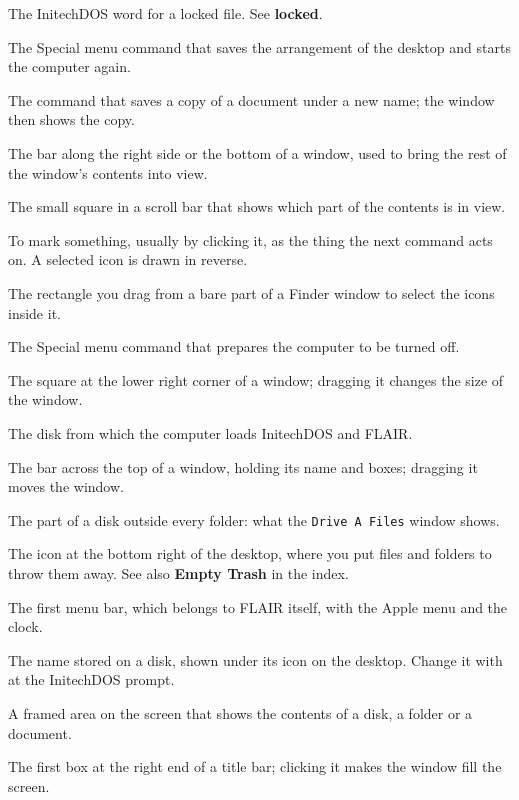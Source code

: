 The InitechDOS word for a locked file.  See
\textbf{locked}.

The Special menu command that saves the arrangement
of the desktop and starts the computer again.

The command that saves a copy of a document under a
new name; the window then shows the copy.

The bar along the right side or the bottom of a
window, used to bring the rest of the window's contents into view.

The small square in a scroll bar that shows which
part of the contents is in view.

To mark something, usually by clicking it, as the
thing the next command acts on.  A selected icon is drawn in reverse.

The rectangle you drag from a bare part
of a Finder window to select the icons inside it.

The Special menu command that prepares the
computer to be turned off.

The square at the lower right corner of a window;
dragging it changes the size of the window.

The disk from which the computer loads
InitechDOS and FLAIR.

The bar across the top of a window, holding its
name and boxes; dragging it moves the window.

The part of a disk outside every folder: what the
\texttt{Drive A Files} window shows.

The icon at the bottom right of the desktop, where you
put files and folders to throw them away.  See also \textbf{Empty Trash}
in the index.

The first menu bar, which belongs to FLAIR
itself, with the Apple menu and the clock.

The name stored on a disk, shown under its icon
on the desktop.  Change it with  at the InitechDOS prompt.

A framed area on the screen that shows the contents of
a disk, a folder or a document.

The first box at the right end of a title bar;
clicking it makes the window fill the screen.
